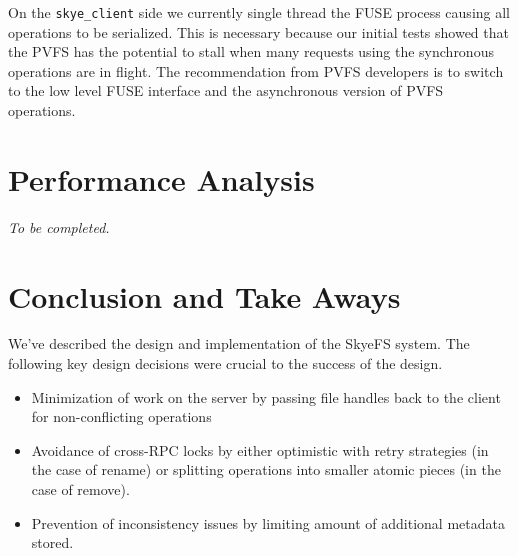 \documentclass[twocolumn,letterpaper]{article}
\newcommand{\code}[1]{\texttt{#1}}
\begin{document}
On the \code{skye\_\-client} side we currently single thread the FUSE process
causing all operations to be serialized.  This is necessary because our
initial tests showed that the PVFS has the potential to stall when many
requests using the synchronous operations are in flight.  The recommendation
from PVFS developers is to switch to the low level FUSE interface and the
asynchronous version of PVFS operations.

\section{Performance Analysis}

\emph{To be completed.}

\section{Conclusion and Take Aways}
We've described the design and implementation of the SkyeFS system.  The
following key design decisions were crucial to the success of the design.

\begin{itemize}
\item Minimization of work on the server by passing file handles back to the client
for non-conflicting operations
\item Avoidance of cross-RPC locks by either optimistic with retry strategies (in
the case of rename) or splitting operations into smaller atomic pieces (in the
case of remove).
\item Prevention of inconsistency issues by limiting amount of additional metadata
stored.
\end{itemize}
\end{document}
